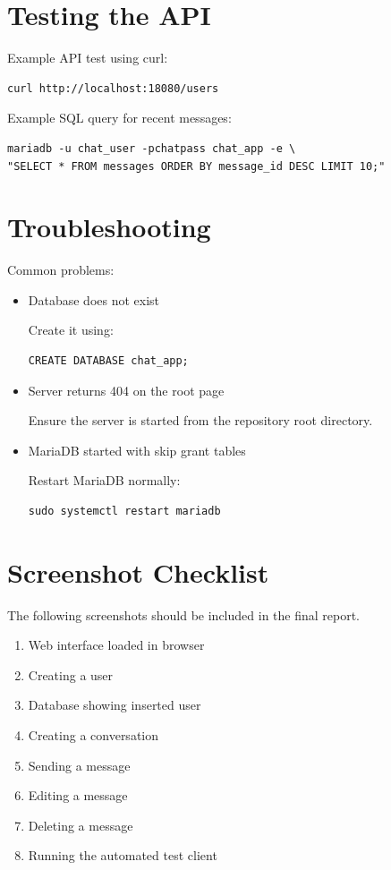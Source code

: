 \documentclass[11pt]{article}
\begin{document}
\section*{Testing the API}

Example API test using curl:

\begin{verbatim}
curl http://localhost:18080/users
\end{verbatim}

Example SQL query for recent messages:

\begin{verbatim}
mariadb -u chat_user -pchatpass chat_app -e \
"SELECT * FROM messages ORDER BY message_id DESC LIMIT 10;"
\end{verbatim}

\section*{Troubleshooting}

Common problems:

\begin{itemize}
\item Database does not exist

Create it using:

\begin{verbatim}
CREATE DATABASE chat_app;
\end{verbatim}

\item Server returns 404 on the root page

Ensure the server is started from the repository root directory.

\item MariaDB started with skip grant tables

Restart MariaDB normally:

\begin{verbatim}
sudo systemctl restart mariadb
\end{verbatim}

\end{itemize}

\section*{Screenshot Checklist}

The following screenshots should be included in the final report.

\begin{enumerate}
\item Web interface loaded in browser
\item Creating a user
\item Database showing inserted user
\item Creating a conversation
\item Sending a message
\item Editing a message
\item Deleting a message
\item Running the automated test client
\end{enumerate}
\end{document}
